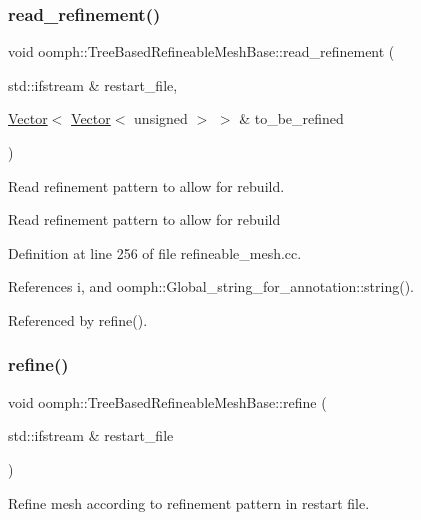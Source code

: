 \subsubsection{\texorpdfstring{read\+\_\+refinement()}{read\_refinement()}}
{\footnotesize\ttfamily void oomph\+::\+Tree\+Based\+Refineable\+Mesh\+Base\+::read\+\_\+refinement (\begin{DoxyParamCaption}\item[{std\+::ifstream \&}]{restart\+\_\+file,  }\item[{\hyperlink{classoomph_1_1Vector}{Vector}$<$ \hyperlink{classoomph_1_1Vector}{Vector}$<$ unsigned $>$ $>$ \&}]{to\+\_\+be\+\_\+refined }\end{DoxyParamCaption})\hspace{0.3cm}{\ttfamily [virtual]}}



Read refinement pattern to allow for rebuild. 

Read refinement pattern to allow for rebuild 

Definition at line 256 of file refineable\+\_\+mesh.\+cc.



References i, and oomph\+::\+Global\+\_\+string\+\_\+for\+\_\+annotation\+::string().



Referenced by refine().

\mbox{\label{classoomph_1_1TreeBasedRefineableMeshBase_a5753ea33897c77342d00644bef86ba74}} 
\subsubsection{\texorpdfstring{refine()}{refine()}}
{\footnotesize\ttfamily void oomph\+::\+Tree\+Based\+Refineable\+Mesh\+Base\+::refine (\begin{DoxyParamCaption}\item[{std\+::ifstream \&}]{restart\+\_\+file }\end{DoxyParamCaption})\hspace{0.3cm}{\ttfamily [virtual]}}



Refine mesh according to refinement pattern in restart file. 

